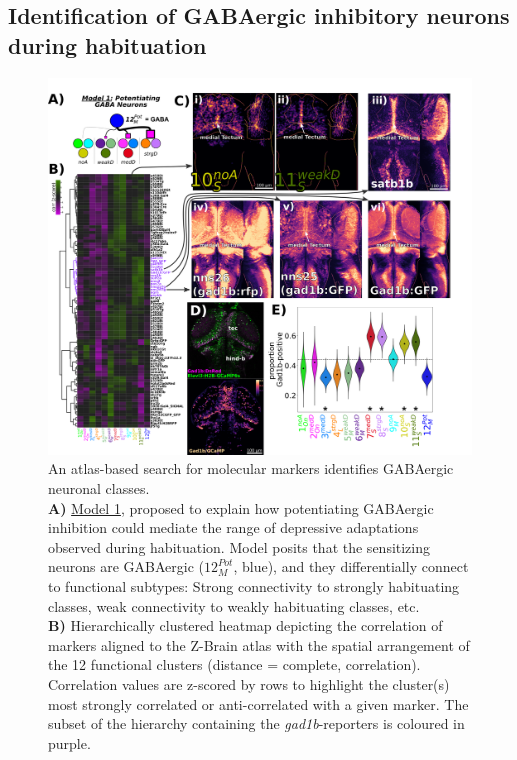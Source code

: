 \documentclass[9pt,lineno]{RandlettLab_elife}
\begin{document}
\subsection{Identification of GABAergic inhibitory neurons during habituation}

\begin{figure}
\begin{fullwidth}
\begin{center}
\includegraphics[width=0.99\linewidth]{Figure7-GABA.png}
\caption{
An atlas-based search for molecular markers identifies GABAergic neuronal classes. 
\\ \textbf{A)} \underline{Model 1}, proposed to explain how potentiating GABAergic inhibition could mediate the range of depressive adaptations observed during habituation. Model posits that the sensitizing neurons are GABAergic ($12_{M}^{Pot}$, blue), and they differentially connect to functional subtypes: Strong connectivity to strongly habituating classes, weak connectivity to weakly habituating classes, etc. 
\\ \textbf{B)} Hierarchically clustered heatmap depicting the correlation of markers aligned to the Z-Brain atlas with the spatial arrangement of the 12 functional clusters  (distance = complete, correlation). Correlation values are z-scored by rows to highlight the cluster(s) most strongly correlated or anti-correlated with a given marker. The subset of the hierarchy containing the \emph{gad1b}-reporters is coloured in purple. 
}
\end{center}
\end{fullwidth}
\end{figure}
\end{document}
